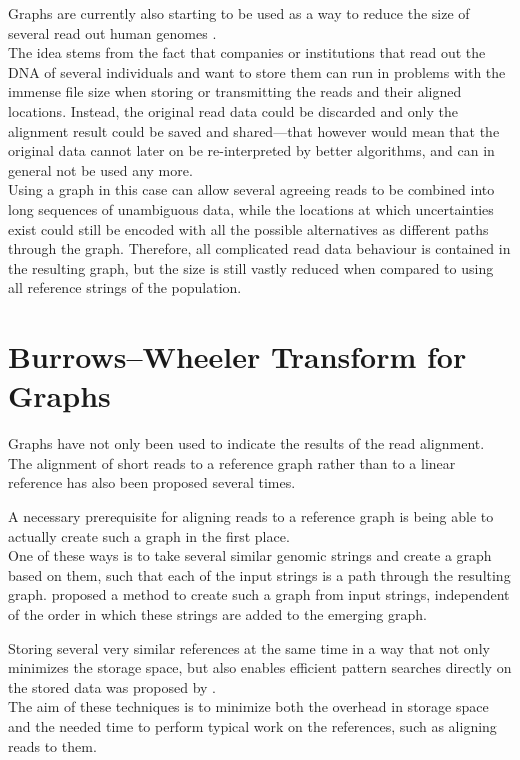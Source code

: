 \documentclass[a4paper,12pt,twoside,BCOR=10mm]{scrbook}
\begin{document}
Graphs are currently also starting to be used as a way to reduce the size of several read out human 
genomes \citep{Li2014}. \\
The idea stems from the fact that companies or institutions that read out the DNA of several individuals 
and want to store them can run in problems with the immense file size when storing or transmitting the reads and their 
aligned locations. Instead, the original read data could be discarded and only the alignment result could be saved and shared---that 
however would mean that the original data cannot later on be re-interpreted by better algorithms, and can in general 
not be used any more. \\
Using a graph in this case can allow several agreeing reads to be combined into long sequences of unambiguous data, 
while the locations at which uncertainties exist could still be encoded with all the possible alternatives as 
different paths through the graph. Therefore, all complicated read data behaviour is contained in the resulting 
graph, but the size is still vastly reduced when compared to using all reference strings of the population.

\section{Burrows--Wheeler Transform for Graphs}

Graphs have not only been used to indicate the results of the read alignment. 
The alignment of short reads to a reference graph rather than to a linear reference has 
also been proposed several times.

A necessary prerequisite for aligning reads to a reference graph is 
being able to actually create such a graph in the first place. \\
One of these ways is to take several similar genomic strings and create a graph based 
on them, such that each of the input strings is a path through the resulting graph. 
\citet{Lee2002} proposed a method to create such a graph from input strings, 
independent of the order in which these strings 
are added to the emerging graph.

Storing several very similar references at the same time in a way that not only minimizes 
the storage space, but also enables efficient pattern searches directly on the 
stored data was proposed by \citet{Makinen2010}. \\
The aim of these techniques is to 
minimize both the overhead in storage space and the needed time to perform typical work 
on the references, such as aligning reads to them.
\end{document}
